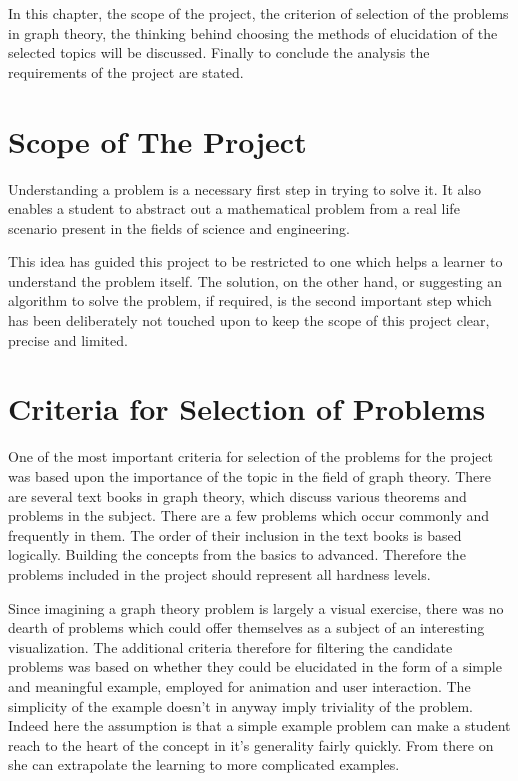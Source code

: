 In this chapter, the scope of the project, the criterion of selection of the
problems in graph theory, the thinking behind choosing the methods of
elucidation of the selected topics will be discussed. Finally to conclude the analysis
the requirements of the project are stated.


\section{Scope of The Project}

Understanding a problem is a necessary first step in trying to solve it.
It also enables a student to abstract out a mathematical
problem from a real life scenario present in the fields of science and engineering.

This idea has guided this project to be restricted to one which helps a learner to
understand the problem itself. The solution, on the other hand, or suggesting an
algorithm to solve the problem, if required, is the second important step which
has been deliberately not touched upon to keep the scope of this project
clear, precise and limited.


\section{Criteria for Selection of Problems}

One of the most important criteria for selection of the problems for the project was
based upon the importance of the topic in the field of graph theory. There are
several text books in graph theory, which discuss various theorems and problems in
the subject.  There are a few problems which occur commonly and frequently in
them. The order of their inclusion in the text books is based logically.
Building the concepts from the basics to advanced. Therefore the problems
included in the project should represent all hardness levels.

Since imagining a graph theory problem is largely a visual exercise, there
was no dearth of problems which could offer themselves as a subject of an
interesting visualization. The additional criteria therefore for filtering the
candidate problems was based on whether they could be elucidated in the form of a
simple and meaningful example, employed for animation and user
interaction. The simplicity of the example doesn't in anyway imply
triviality of the problem. Indeed here the assumption is that a simple example
problem can make a student reach to the heart of the concept in it's generality
fairly quickly. From there on she can extrapolate the learning to more
complicated examples.

